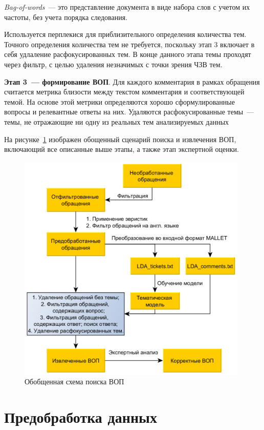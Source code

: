 \textit{Bag-of-words}~--- это представление документа в виде набора слов с учетом их частоты, без учета порядка следования.

Используется перплекися для приблизительного определения количества тем. Точного определения количества тем не требуется, поскольку этап 3 включает в себя удлаление расфокусированных тем. В конце данного этапа темы проходят через фильтр, с целью удаления незначимых с точки зрения ЧЗВ тем.

\textbf{Этап 3~--- формирование ВОП}. Для каждого комментария в рамках обращения считается метрика близости между текстом комментария и соответствующей темой. На основе этой метрики определяются хорошо сформулированные вопросы и релевантные ответы на них. Удаляются расфокусированные темы~--- темы, не отражающие ни одну из реальных тем анализируемых данных

На рисунке~\ref{fig:common_scheme} изображен обощенный сценарий поиска и извлечения ВОП, включающий все описанные выше этапы, а также этап экспертной оценки.

\begin{figure}[tph!]
\centerline{\includegraphics[width=11cm]{fig/schema2_rus.png}}
    \caption{Обобщенная схема поиска ВОП}
    \label{fig:common_scheme}
\end{figure}

\section{Предобработка данных}
\label{sec:dev}

